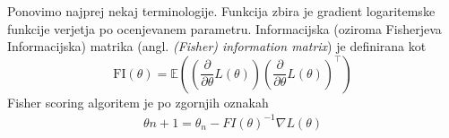 \documentclass[12pt,a4paper]{amsart}
\theoremstyle{definition} %
\theoremstyle{plain} %
\begin{document}
Ponovimo najprej nekaj terminologije. Funkcija zbira je gradient logaritemske funkcije verjetja po ocenjevanem parametru.
Informacijska (oziroma Fisherjeva Informacijska) matrika (angl. \textit{(Fisher) information matrix}) je definirana kot 
\[
    \mathrm{FI}(\theta) = \mathbb{E}\left(\left(\frac{\partial}{\partial\theta} L(\theta)\right) \left(\frac{\partial}{\partial\theta} L(\theta)\right)^\top \right) %
\]
Fisher scoring algoritem je po zgornjih oznakah 
\begin{align}
    \theta{n + 1} = \theta_{n} - FI(\theta)^{-1}\nabla L(\theta)
\end{align}
%
\end{document}
